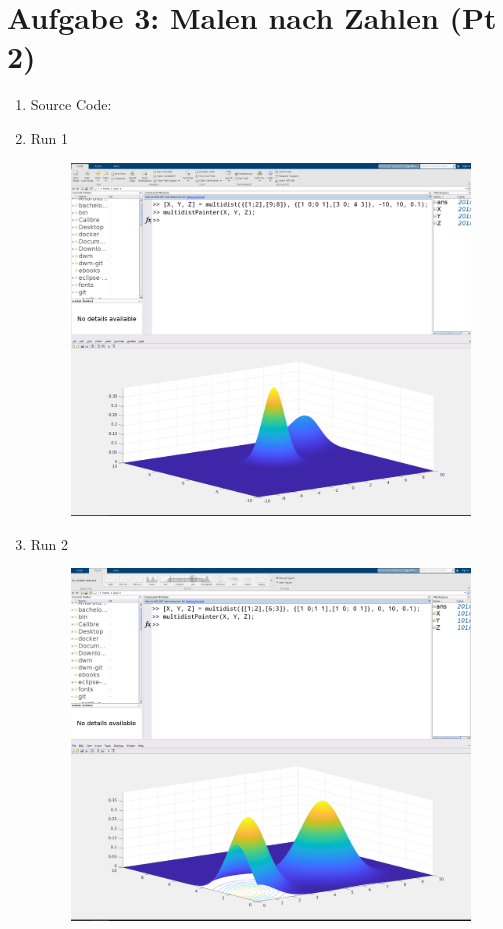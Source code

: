 \documentclass[12pt,a4paper]{article}
\begin{document}
\section*{Aufgabe 3: Malen nach Zahlen (Pt 2)}
\begin{enumerate}[leftmargin=!,labelindent=5pt]
	\item Source Code:
		
		

	\item Run 1
		\begin{figure}[H]
			\centering
			\includegraphics[scale=0.4]{./img/multidist_01.png}
		\end{figure}
		\newpage

	\item Run 2
		\begin{figure}[H]
			\centering
			\includegraphics[scale=0.4]{./img/multidist_02.png}
		\end{figure}
\end{enumerate}
\end{document}
